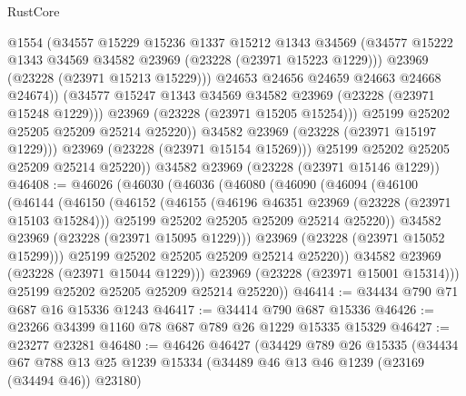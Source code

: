 \begin{lexlean}{RustCore}
\begin{coremodule}
                      @1554
                      (@34557
                        @15229
                        @15236
                        @1337
                        @15212
                        @1343
                        @34569
                        (@34577 @15222 @1343 @34569 @34582 @23969 (@23228 (@23971 @15223 @1229)))
                        @23969
                        (@23228 (@23971 @15213 @15229)))
                      @24653
                      @24656
                      @24659
                      @24663
                      @24668
                      @24674))
                  (@34577 @15247 @1343 @34569 @34582 @23969 (@23228 (@23971 @15248 @1229)))
                  @23969
                  (@23228 (@23971 @15205 @15254)))
                @25199
                @25202
                @25205
                @25209
                @25214
                @25220))
            @34582
            @23969
            (@23228 (@23971 @15197 @1229)))
          @23969
          (@23228 (@23971 @15154 @15269)))
        @25199
        @25202
        @25205
        @25209
        @25214
        @25220))
    @34582
    @23969
    (@23228 (@23971 @15146 @1229))
@46408 := @46026
    (@46030
      (@46036
        (@46080
          (@46090
            (@46094
              (@46100
                (@46144
                  (@46150
                    (@46152
                      (@46155
                        (@46196 @46351 @23969 (@23228 (@23971 @15103 @15284)))
                        @25199
                        @25202
                        @25205
                        @25209
                        @25214
                        @25220))
                    @34582
                    @23969
                    (@23228 (@23971 @15095 @1229)))
                  @23969
                  (@23228 (@23971 @15052 @15299)))
                @25199
                @25202
                @25205
                @25209
                @25214
                @25220))
            @34582
            @23969
            (@23228 (@23971 @15044 @1229)))
          @23969
          (@23228 (@23971 @15001 @15314)))
        @25199
        @25202
        @25205
        @25209
        @25214
        @25220))
@46414 := @34434 @790 @71 @687 @16 @15336 @1243
@46417 := @34414 @790 @687 @15336
@46426 := @23266 @34399 @1160 @78 @687 @789 @26 @1229 @15335 @15329
@46427 := @23277 @23281
@46480 := @46426
    @46427
    (@34429
      @789
      @26
      @15335
      (@34434
        @67
        @788
        @13
        @25
        @1239
        @15334
        (@34489 @46 @13 @46 @1239 (@23169 (@34494 @46)) @23180)

\end{coremodule}
\end{lexlean}
